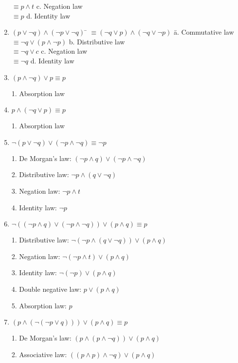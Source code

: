 \documentclass{article}
\begin{document}
\begin{enumerate}[label=\textbf{\arabic*.}]
\begin{tabbing}
\> $\equiv p \land t$ \> c. Negation law\\
\> $\equiv p$ \> d. Identity law
\end{tabbing}
\item %
\begin{tabbing}
$(p \lor \neg q) \land (\neg p \lor \neg q)$ \= $\equiv (\neg q \lor p) \land (\neg q \lor \neg p)$ \hspace{1cm} \= a. Commutative law\\
\> $\equiv \neg q \lor (p \land \neg p)$ \> b. Distributive law\\
\> $\equiv \neg q \lor c$ \> c. Negation law\\
\> $\equiv \neg q$ \> d. Identity law
\end{tabbing}
\item %
$(p \land \neg q) \lor p \equiv p$

1. Absorption law
\item %
$p \land (\neg q \lor p) \equiv p$

1. Absorption law
\item %
$\neg (p \lor \neg q) \lor (\neg p \land \neg q) \equiv \neg p$

1. De Morgan's law: $(\neg p \land q) \lor (\neg p \land \neg q)$

2. Distributive law: $\neg p \land (q \lor \neg q)$

3. Negation law: $\neg p \land t$

4. Identity law: $\neg p$
\item %
$\neg ((\neg p \land q) \lor (\neg p \land \neg q)) \lor (p \land q) \equiv p$

1. Distributive law: $\neg (\neg p \land (q \lor \neg q)) \lor (p \land q)$

2. Negation law: $\neg (\neg p \land t) \lor (p \land q)$

3. Identity law: $\neg (\neg p) \lor (p \land q)$

4. Double negative law: $p \lor (p \land q)$

5. Absorption law: $p$
\item %
$(p \land (\neg(\neg p \lor q))) \lor (p \land q) \equiv p$

1. De Morgan's law: $(p \land (p \land \neg q)) \lor (p \land q)$

2. Associative law: $((p \land p) \land \neg q) \lor (p \land q)$ 


\end{enumerate}
\end{document}
